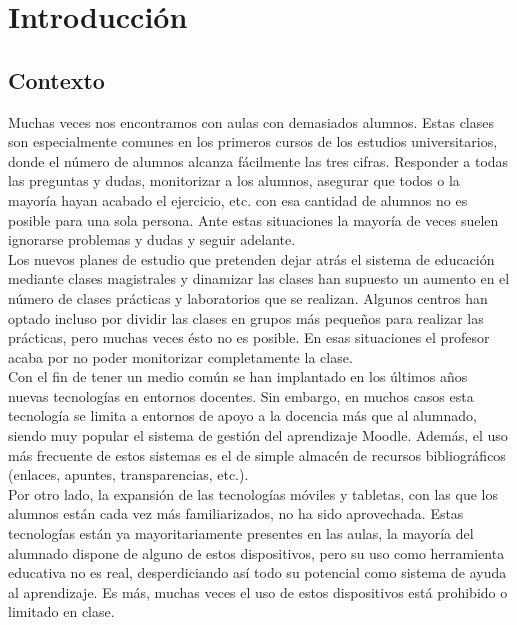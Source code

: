 
\pagestyle{fancy}

\chapter{Introducción}
\label{introduccion}

\section{Contexto}

Muchas veces nos encontramos con aulas con demasiados alumnos. Estas clases son especialmente comunes en los primeros cursos de los estudios universitarios, donde el número de alumnos alcanza fácilmente las tres cifras. Responder a todas las preguntas y dudas, monitorizar a los alumnos, asegurar que todos o la mayoría hayan acabado el ejercicio, etc. con esa cantidad de alumnos no es posible para una sola persona. Ante estas situaciones la mayoría de veces suelen ignorarse problemas y dudas y seguir adelante.\\

Los nuevos planes de estudio que pretenden dejar atrás el sistema de educación mediante clases magistrales y dinamizar las clases han supuesto un aumento en el número de clases prácticas y laboratorios que se realizan. Algunos centros han optado incluso por dividir las clases en grupos más pequeños para realizar las prácticas, pero muchas veces ésto no es posible. En esas situaciones el profesor acaba por no poder monitorizar completamente la clase.\\

Con el fin de tener un medio común se han implantado en los últimos años nuevas tecnologías en entornos docentes. Sin embargo, en muchos casos esta tecnología se limita a entornos de apoyo a la docencia más que al alumnado, siendo muy popular el sistema de gestión del aprendizaje Moodle. Además, el uso más frecuente de estos sistemas es el de simple almacén de recursos bibliográficos (enlaces, apuntes, transparencias, etc.).\\

Por otro lado, la expansión de las tecnologías móviles y tabletas, con las que los alumnos están cada vez más familiarizados, no ha sido aprovechada. Estas tecnologías están ya mayoritariamente presentes en las aulas, la mayoría del alumnado dispone de alguno de estos dispositivos, pero su uso como herramienta educativa no es real, desperdiciando así todo su potencial como sistema de ayuda al aprendizaje. Es más, muchas veces el uso de estos dispositivos está prohibido o limitado en clase.\\

